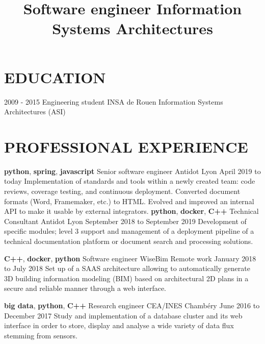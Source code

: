 \documentclass[11pt,a4paper]{moderncv}
\title{
  Software engineer \newline{}
  Information Systems Architectures
}
\begin{document}
  \maketitle
  \vspace*{-5mm}
  \section{EDUCATION}

  \cventry
    {2009 - 2015}
    {Engineering student}
    {INSA de Rouen}
    {Information Systems Architectures (ASI)}
	{}{}



  \section{PROFESSIONAL EXPERIENCE}
  \label{sec:professional-experience}

  \cventry
    {\textbf{python}, \textbf{spring}, \textbf{javascript}}
    {Senior software engineer}
    {Antidot}
    {Lyon}
    {April 2019 to today}{
      Implementation of standards and tools within a newly created team: code reviews,
      coverage testing, and continuous deployment. Converted document formats (Word, Framemaker, etc.) to
      HTML. Evolved and improved an internal API to make it usable by external integrators.
    }
  \cventry
    {\textbf{python}, \textbf{docker}, \textbf{C++}}
    {Technical Consultant}
    {Antidot}
    {Lyon}
    {September 2018 to September 2019}{
        Development of specific modules; level 3 support and management of a deployment pipeline
        of a technical documentation platform or document search and processing solutions.
    }

  \cventry
    {\textbf{C++}, \textbf{docker}, \textbf{python}}
    {Software engineer}
    {WiseBim}
    {Remote work}
    {January 2018 to July 2018}{
      Set up of a SAAS architecture allowing to automatically generate 3D
	  building information modeling (BIM) based on architectural 2D plans in
	  a secure and reliable manner through a web interface.
    }

  \cventry
    {\textbf{big data}, \textbf{python}, \textbf{C++}}
    {Research engineer}
    {CEA/INES}
    {Chambéry}
    {June 2016 to December 2017}{
      Study and implementation of a database cluster and its web interface in
      order to store, display and analyse a wide variety of data flux stemming
      from sensors.
    }
\end{document}
